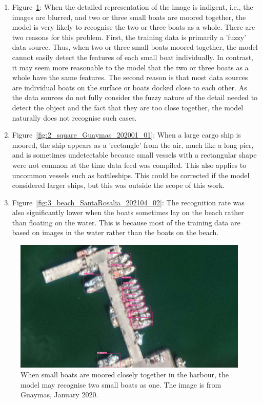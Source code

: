 \begin{enumerate}
    \item Figure~\ref{fig:1_docked_together_Guaymas_202001_20}: When the detailed representation of the image is indigent, i.e., the images are blurred, and two or three small boats are moored together, the model is very likely to recognise the two or three boats as a whole. There are two reasons for this problem. First, the training data is primarily a 'fuzzy' data source. Thus, when two or three small boats moored together, the model cannot easily detect the features of each small boat individually. In contrast, it may seem more reasonable to the model that the two or three boats as a whole have the same features. The second reason is that most data sources are individual boats on the surface or boats docked close to each other. As the data sources do not fully consider the fuzzy nature of the detail needed to detect the object and the fact that they are too close together, the model naturally does not recognise such cases.

    
    \item Figure~\ref{fig:2_square_Guaymas_202001_01}: When a large cargo ship is moored, the ship appears as a 'rectangle' from the air, much like a long pier, and is sometimes undetectable because small vessels with a rectangular shape were not common at the time data feed was compiled. This also applies to uncommon vessels such as battleships. This could be corrected if the model considered larger ships, but this was outside the scope of this work.

    \item Figure~\ref{fig:3_beach_SantaRosalia_202104_02}: The recognition rate was also significantly lower when the boats sometimes lay on the beach rather than floating on the water. This is because most of the training data are based on images in the water rather than the boats on the beach.

\end{enumerate}

\begin{figure}[t]
    \centering
    \includegraphics[width=\columnwidth]{img/1_docked_together_Guaymas_202001_20.jpeg}
    \caption{When small boats are moored closely together in the harbour, the model may recognise two small boats as one. The image is from Guaymas, January 2020.}
    \label{fig:1_docked_together_Guaymas_202001_20}
\end{figure}

